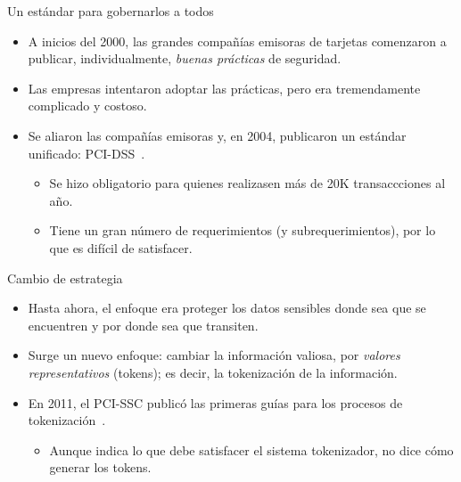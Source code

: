 \begin{frame}{Un estándar para gobernarlos a todos}
  \begin{itemize}
    \item A inicios del 2000, las grandes compañías emisoras de
      tarjetas\footnotemark{} comenzaron a publicar, individualmente,
      \textit{buenas prácticas} de seguridad.
    \item Las empresas intentaron adoptar las prácticas, pero era tremendamente
      complicado y costoso.
    \item Se aliaron las compañías emisoras y, en 2004, publicaron un estándar
      unificado: PCI-DSS\footnotemark~\cite{pci_dss}.
      \begin{itemize}
        \item Se hizo obligatorio para quienes realizasen más de 20K
          transaccciones al año.
        \item Tiene un gran número de requerimientos (y subrequerimientos), por
          lo que es difícil de satisfacer.
      \end{itemize}
  \end{itemize}


\end{frame}

\begin{frame}{Cambio de estrategia}
  \begin{itemize}
    \item Hasta ahora, el enfoque era proteger los datos sensibles donde sea
      que se encuentren y por donde sea que transiten.
    \item Surge un nuevo enfoque: cambiar la información valiosa, por
      \textit{valores representativos} (tokens); es decir, la tokenización
      de la información.
    \item En 2011, el PCI-SSC\footnotemark{} publicó las primeras guías para los
      procesos de tokenización~\cite{pci_tokens}.
      \begin{itemize}
        \item Aunque indica lo que debe satisfacer el sistema tokenizador,
          no dice cómo generar los tokens.
      \end{itemize}
  \end{itemize}
\end{frame}

